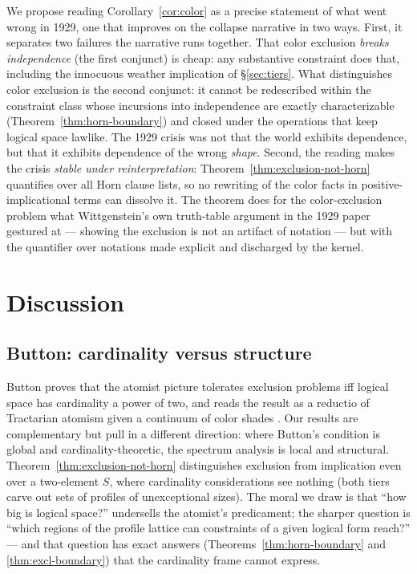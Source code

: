 \documentclass[10pt, letterpaper]{article}
\theoremstyle{remark}
\begin{document}
We propose reading Corollary~\ref{cor:color} as a precise statement of what
went wrong in 1929, one that improves on the collapse narrative in two ways.
First, it separates two failures the narrative runs together. That color
exclusion \emph{breaks independence} (the first conjunct) is cheap: any
substantive constraint does that, including the innocuous weather
implication of \S\ref{sec:tiers}. What distinguishes color exclusion is the
second conjunct: it cannot be redescribed within the constraint class whose
incursions into independence are exactly characterizable
(Theorem~\ref{thm:horn-boundary}) and closed under the operations that keep
logical space lawlike. The 1929 crisis was not that the world exhibits
dependence, but that it exhibits dependence of the wrong \emph{shape}.
Second, the reading makes the crisis \emph{stable under reinterpretation}:
Theorem~\ref{thm:exclusion-not-horn} quantifies over all Horn clause lists,
so no rewriting of the color facts in positive-implicational terms can
dissolve it. The theorem does for the color-exclusion problem what
Wittgenstein's own truth-table argument in the 1929 paper gestured at ---
showing the exclusion is not an artifact of notation --- but with the
quantifier over notations made explicit and discharged by the kernel.

\section{Discussion}\label{sec:discussion}

\subsection{Button: cardinality versus structure}

Button proves that the atomist picture tolerates exclusion problems iff
logical space has cardinality a power of two, and reads the result as a
reductio of Tractarian atomism given a continuum of color shades
\cite{button2017}. Our results are complementary but pull in a different
direction: where Button's condition is global and cardinality-theoretic, the
spectrum analysis is local and structural. Theorem~\ref{thm:exclusion-not-horn}
distinguishes exclusion from implication even over a two-element $S$, where
cardinality considerations see nothing (both tiers carve out sets of profiles
of unexceptional sizes). The moral we draw is that ``how big is logical
space?'' undersells the atomist's predicament; the sharper question is
``which regions of the profile lattice can constraints of a given logical
form reach?'' --- and that question has exact answers
(Theorems~\ref{thm:horn-boundary} and \ref{thm:excl-boundary}) that the
cardinality frame cannot express.
\end{document}
